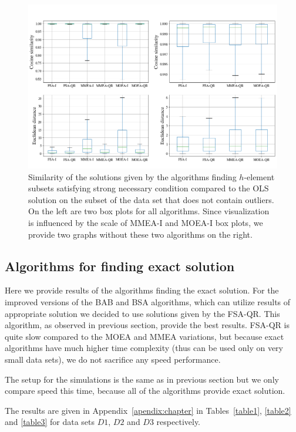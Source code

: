 \begin{figure}[h]
    \centering
    \includegraphics[width=14cm]{img/all_distances_feasible}

    \caption{Similarity of the solutions given by the algorithms finding $h$-element subsets satisfying strong necessary condition compared to the OLS solution on the subset of the data set that does not contain outliers. On the left are two box plots for all algorithms. Since visualization is influenced by the scale of MMEA-I and MOEA-I box plots, we provide two graphs without these two algorithms on the right.}
    \label{all_distances}
\end{figure}

\subsection{Algorithms for finding exact solution}
Here we provide results of the algorithms finding the exact solution. For the improved versions of the BAB and BSA algorithms, which can utilize results of appropriate solution we decided to use solutions given by the FSA-QR. This algorithm, as observed in previous section, provide the best results. FSA-QR is quite slow compared to the MOEA and MMEA variations, but because exact algorithms have much higher time complexity (thus can be used only on very small data sets), we do not sacrifice any speed performance.

The setup for the simulations is the same as in previous section but we only compare speed this time, because all of the algorithms provide exact solution. 

The results are given in Appendix~\ref{apendix:chapter} in Tables~\ref{table1}, \ref{table2} and \ref{table3} for data sets $D1$, $D2$ and $D3$ respectively. 
    
